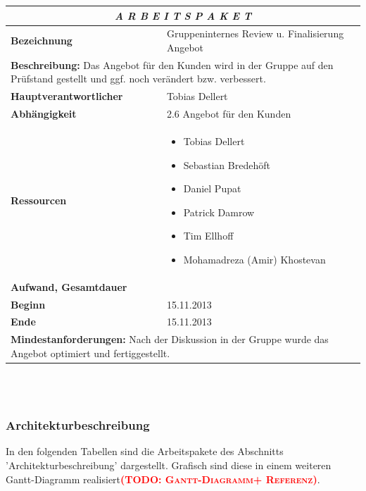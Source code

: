\documentclass[fontsize=12pt,paper=a4,twoside]{scrartcl}
\newcommand{\todo}[1]{\textbf{\textsc{\textcolor{red}{(TODO: #1)}}}}
\begin{document}
\begin{tabular}{p{7.5cm}|p{7.5cm}}\toprule
\multicolumn{2}{c}{\textbf{\textit{A R B E I T S P A K E T \quad 2.8}}} \\ \toprule \hline
\textbf{Bezeichnung} & Gruppeninternes Review u. Finalisierung Angebot\\\hline
\multicolumn{2}{p{15cm}}{\textbf{Beschreibung:} \newline 
Das Angebot für den Kunden wird in der Gruppe auf den Prüfstand gestellt und ggf. noch verändert bzw. verbessert.}  \\\hline
\textbf{Hauptverantwortlicher} & Tobias Dellert \\\hline
\textbf{Abhängigkeit} & 2.6 Angebot für den Kunden\\\hline
\textbf{Ressourcen} & \begin{itemize} 
\itemsep0pt
\item Tobias Dellert
\item Sebastian Bredehöft
\item Daniel Pupat
\item Patrick Damrow
\item Tim Ellhoff
\item Mohamadreza (Amir) Khostevan
\end{itemize} \\\hline
\textbf{Aufwand, Gesamtdauer} & \\\hline
\textbf{Beginn} & 15.11.2013 \\\hline
\textbf{Ende} & 15.11.2013\\\hline
\multicolumn{2}{p{15cm}}{\textbf{Mindestanforderungen: } \newline
Nach der Diskussion in der Gruppe wurde das Angebot optimiert und fertiggestellt. }  \\ \toprule
\end{tabular} \\\\

\subsubsection{Architekturbeschreibung}\label{aps}

In den folgenden Tabellen sind die Arbeitspakete des Abschnitts 'Architekturbeschreibung' dargestellt. Grafisch sind diese in einem weiteren Gantt-Diagramm realisiert\todo{Gantt-Diagramm+ Referenz}.
\end{document}

